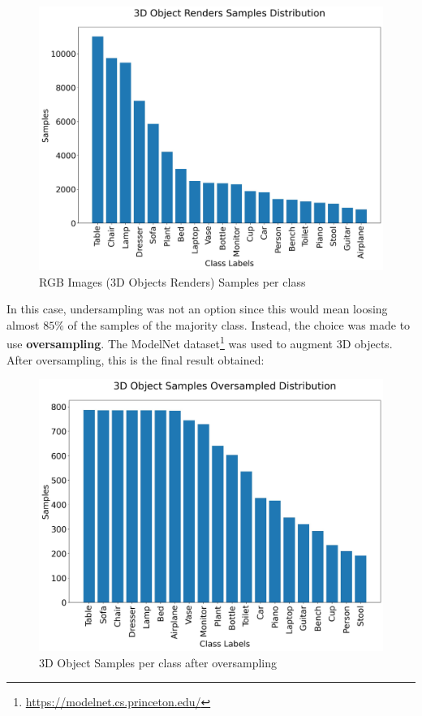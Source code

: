\documentclass[11pt,a4paper]{article}
\begin{document}
\begin{figure}[H]
    \centering
    \includegraphics[scale=0.35]{imgs/3d-object-renders-samples-distribution.jpg}
    \caption{RGB Images (3D Objects Renders) Samples per class}
\end{figure}
\noindent
In this case, undersampling was not an option since this would mean loosing almost $85\%$ of the samples of the majority class. Instead, the choice was made to use \textbf{oversampling}. The ModelNet \cite{wu20153d} dataset\footnote{\url{https://modelnet.cs.princeton.edu/}} was used to augment 3D objects. After oversampling, this is the final result obtained:
\begin{figure}[H]
    \centering
    \includegraphics[scale=0.35]{imgs/3d-object-oversampled-distribution.jpg}
    \caption{3D Object Samples per class after oversampling}
\end{figure}
\end{document}
